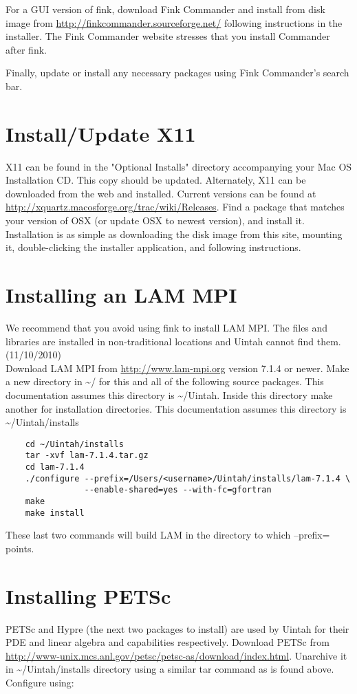 \documentclass[11pt,fleqn]{book} %
\begin{document}
For a GUI version of fink, download Fink Commander and install from
disk image from \url{http://finkcommander.sourceforge.net/} following
instructions in the installer.  The Fink Commander website stresses
that you install Commander after fink.

Finally, update or install any necessary packages using Fink
Commander's search bar.

\section{Install/Update X11}
X11 can be found in the "Optional Installs" directory accompanying
your Mac OS Installation CD.  This copy should be updated.
Alternately, X11 can be downloaded from the web and installed.
Current versions can be found at
\url{http://xquartz.macosforge.org/trac/wiki/Releases}.  Find a
package that matches your version of OSX (or update OSX to newest
version), and install it.  Installation is as simple as downloading
the disk image from this site, mounting it, double-clicking the
installer application, and following instructions.

\section{Installing an LAM MPI}
We recommend that you avoid using fink to install LAM MPI.
The files and libraries are installed in non-traditional locations 
and Uintah cannot find them. (11/10/2010) \\

Download LAM MPI from \url{http://www.lam-mpi.org}
version 7.1.4 or newer.  Make a new directory in \textasciitilde/ for
this and all of the following source packages.  This documentation
assumes this directory is \textasciitilde/Uintah.  Inside this
directory make another for installation directories.  This
documentation assumes this directory is
\textasciitilde/Uintah/installs

\begin{lstlisting}
	cd ~/Uintah/installs
	tar -xvf lam-7.1.4.tar.gz
	cd lam-7.1.4
	./configure --prefix=/Users/<username>/Uintah/installs/lam-7.1.4 \
	            --enable-shared=yes --with-fc=gfortran
	make
	make install
\end{lstlisting}

These last two commands will build LAM in the directory to which
--prefix= points.

\section{Installing PETSc}
PETSc and Hypre (the next two packages to install) are used by Uintah
for their PDE and linear algebra and capabilities respectively.
Download PETSc from
\url{http://www-unix.mcs.anl.gov/petsc/petsc-as/download/index.html}.
Unarchive it in \textasciitilde/Uintah/installs directory using a
similar tar command as is found above.  Configure using:
\end{document}
